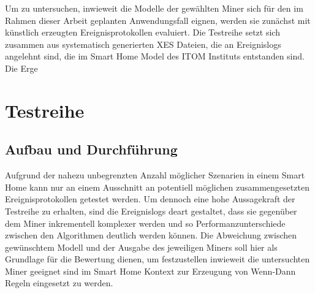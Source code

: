 \begin{table}[!h]
\centering
{}
\caption{Vergleich von Process Mining Verfahren hinsichtlich ihrer Eignung für den Einsatz im Smart Home}
\label{tab:my-table}
\end{table}

Um zu untersuchen, inwieweit die Modelle der gewählten Miner sich für den im Rahmen dieser Arbeit geplanten Anwendungsfall eignen, werden sie zunächst mit künstlich erzeugten Ereignisprotokollen evaluiert. Die Testreihe setzt sich zusammen aus systematisch generierten XES Dateien, die an Ereignislogs angelehnt sind, die im Smart Home Model des ITOM Instituts entstanden sind. Die Erge


\clearpage
\section{Testreihe}
\subsection{Aufbau und Durchführung}
Aufgrund der nahezu unbegrenzten Anzahl möglicher Szenarien in einem Smart Home kann nur an einem Ausschnitt an potentiell möglichen zusammengesetzten Ereignisprotokollen getestet werden. Um dennoch eine hohe Aussagekraft der Testreihe zu erhalten, sind die Ereignislogs deart gestaltet, dass sie gegenüber dem Miner inkrementell komplexer werden und so Performanzunterschiede zwischen den Algorithmen deutlich werden können. Die Abweichung zwischen gewünschtem Modell und der Ausgabe des jeweiligen Miners soll hier als Grundlage für die Bewertung dienen, um festzustellen inwieweit die untersuchten Miner geeignet sind im Smart Home Kontext zur Erzeugung von Wenn-Dann Regeln eingesetzt zu werden. 

